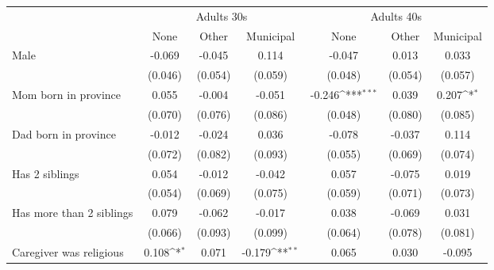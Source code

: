 {
\def\sym#1{\ifmmode^{#1}\else\(^{#1}\)\fi}
\begin{tabular}{l*{6}{c}}
\toprule
 &\multicolumn{3}{c}{Adults 30s}&\multicolumn{3}{c}{Adults 40s} \\
                    &\multicolumn{1}{c}{None}&\multicolumn{1}{c}{Other}&\multicolumn{1}{c}{Municipal}&\multicolumn{1}{c}{None}&\multicolumn{1}{c}{Other}&\multicolumn{1}{c}{Municipal}\\
\midrule
Male                &      -0.069         &      -0.045         &       0.114         &      -0.047         &       0.013         &       0.033         \\
                    &     (0.046)         &     (0.054)         &     (0.059)         &     (0.048)         &     (0.054)         &     (0.057)         \\
\addlinespace
Mom born in province&       0.055         &      -0.004         &      -0.051         &      -0.246\sym{***}&       0.039         &       0.207\sym{*}  \\
                    &     (0.070)         &     (0.076)         &     (0.086)         &     (0.048)         &     (0.080)         &     (0.085)         \\
\addlinespace
Dad born in province&      -0.012         &      -0.024         &       0.036         &      -0.078         &      -0.037         &       0.114         \\
                    &     (0.072)         &     (0.082)         &     (0.093)         &     (0.055)         &     (0.069)         &     (0.074)         \\
\addlinespace
Has 2 siblings      &       0.054         &      -0.012         &      -0.042         &       0.057         &      -0.075         &       0.019         \\
                    &     (0.054)         &     (0.069)         &     (0.075)         &     (0.059)         &     (0.071)         &     (0.073)         \\
\addlinespace
Has more than 2 siblings&       0.079         &      -0.062         &      -0.017         &       0.038         &      -0.069         &       0.031         \\
                    &     (0.066)         &     (0.093)         &     (0.099)         &     (0.064)         &     (0.078)         &     (0.081)         \\
\addlinespace
Caregiver was religious&       0.108\sym{*}  &       0.071         &      -0.179\sym{**} &       0.065         &       0.030         &      -0.095         \\

\end{tabular}}
